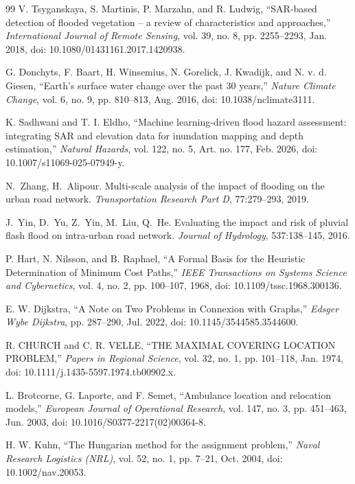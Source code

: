 \begin{thebibliography}{99}
V. Tsyganskaya, S. Martinis, P. Marzahn, and R. Ludwig, ``SAR-based detection of flooded vegetation -- a review of characteristics and approaches,'' \emph{International Journal of Remote Sensing}, vol. 39, no. 8, pp. 2255--2293, Jan. 2018, doi: 10.1080/01431161.2017.1420938.

G. Donchyts, F. Baart, H. Winsemius, N. Gorelick, J. Kwadijk, and N. v. d. Giesen, ``Earth's surface water change over the past 30 years,'' \emph{Nature Climate Change}, vol. 6, no. 9, pp. 810--813, Aug. 2016, doi: 10.1038/nclimate3111.

K. Sadhwani and T. I. Eldho, ``Machine learning-driven flood hazard assessment: integrating SAR and elevation data for inundation mapping and depth estimation,'' \emph{Natural Hazards}, vol. 122, no. 5, Art. no. 177, Feb. 2026, doi: 10.1007/s11069-025-07949-y.

N.~Zhang, H.~Alipour. Multi-scale analysis of the impact of flooding on the urban road network. \emph{Transportation Research Part D}, 77:279--293, 2019.

J.~Yin, D.~Yu, Z.~Yin, M.~Liu, Q.~He. Evaluating the impact and risk of pluvial flash flood on intra-urban road network. \emph{Journal of Hydrology}, 537:138--145, 2016.

P. Hart, N. Nilsson, and B. Raphael, ``A Formal Basis for the Heuristic Determination of Minimum Cost Paths,'' \emph{IEEE Transactions on Systems Science and Cybernetics}, vol. 4, no. 2, pp. 100--107, 1968, doi: 10.1109/tssc.1968.300136.

E. W. Dijkstra, ``A Note on Two Problems in Connexion with Graphs,'' \emph{Edsger Wybe Dijkstra}, pp. 287--290, Jul. 2022, doi: 10.1145/3544585.3544600.

R. CHURCH and C. R. VELLE, ``THE MAXIMAL COVERING LOCATION PROBLEM,'' \emph{Papers in Regional Science}, vol. 32, no. 1, pp. 101--118, Jan. 1974, doi: 10.1111/j.1435-5597.1974.tb00902.x.

L. Brotcorne, G. Laporte, and F. Semet, ``Ambulance location and relocation models,'' \emph{European Journal of Operational Research}, vol. 147, no. 3, pp. 451--463, Jun. 2003, doi: 10.1016/S0377-2217(02)00364-8.

H. W. Kuhn, ``The Hungarian method for the assignment problem,'' \emph{Naval Research Logistics (NRL)}, vol. 52, no. 1, pp. 7--21, Oct. 2004, doi: 10.1002/nav.20053.


\end{thebibliography}
